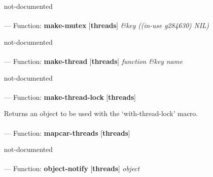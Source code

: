 \begin{adjustwidth}{5em}{5em}
not-documented
\end{adjustwidth}

\paragraph{}
\label{THREADS:MAKE-MUTEX}
--- Function: \textbf{make-mutex} [\textbf{threads}] \textit{\&key ((in-use g284630) NIL)}

\begin{adjustwidth}{5em}{5em}
not-documented
\end{adjustwidth}

\paragraph{}
\label{THREADS:MAKE-THREAD}
--- Function: \textbf{make-thread} [\textbf{threads}] \textit{function \&key name}

\begin{adjustwidth}{5em}{5em}
not-documented
\end{adjustwidth}

\paragraph{}
\label{THREADS:MAKE-THREAD-LOCK}
--- Function: \textbf{make-thread-lock} [\textbf{threads}] \textit{}

\begin{adjustwidth}{5em}{5em}
Returns an object to be used with the `with-thread-lock' macro.
\end{adjustwidth}

\paragraph{}
\label{THREADS:MAPCAR-THREADS}
--- Function: \textbf{mapcar-threads} [\textbf{threads}] \textit{}

\begin{adjustwidth}{5em}{5em}
not-documented
\end{adjustwidth}

\paragraph{}
\label{THREADS:OBJECT-NOTIFY}
--- Function: \textbf{object-notify} [\textbf{threads}] \textit{object}

